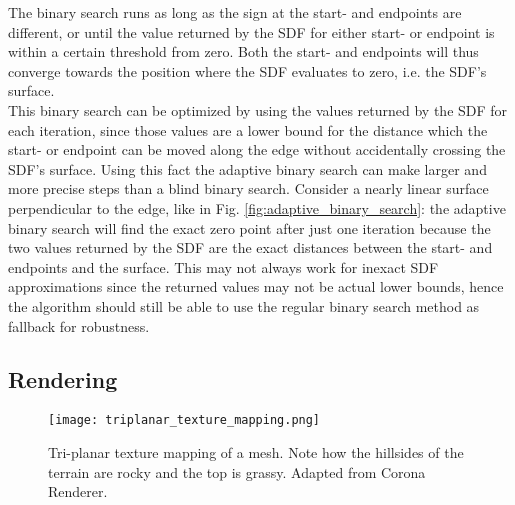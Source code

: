 The binary search runs as long as the sign at the start- and endpoints are different, or until the value returned by the SDF for either start- or endpoint is within a certain threshold from zero. Both the start- and endpoints will thus converge towards the position where the SDF evaluates to zero, i.e. the SDF's surface.\\
This binary search can be optimized by using the values returned by the SDF for each iteration, since those values are a lower bound for the distance which the start- or endpoint can be moved along the edge without accidentally crossing the SDF's surface. Using this fact the adaptive binary search can make larger and more precise steps than a blind binary search. Consider a nearly linear surface perpendicular to the edge, like in Fig. \ref{fig:adaptive_binary_search}: the adaptive binary search will find the exact zero point after just one iteration because the two values returned by the SDF are the exact distances between the start- and endpoints and the surface. This may not always work for inexact SDF approximations since the returned values may not be actual lower bounds, hence the algorithm should still be able to use the regular binary search method as fallback for robustness.

\subsection{Rendering}

\begin{wrapfigure}{R}{0.4\textwidth}
\texttt{[image: triplanar\_texture\_mapping.png]}
\caption{Tri-planar texture mapping of a mesh. Note how the hillsides of the terrain are rocky and the top is grassy.
Adapted from Corona Renderer\protect\footnotemark.}
\label{fig:triplanar_texture_mapping}
\end{wrapfigure}

